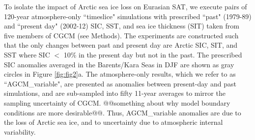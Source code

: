 \documentclass{nature}
\begin{document}


To isolate the impact of Arctic sea ice loss on Eurasian SAT, we execute pairs of 120-year atmosphere-only ``timeslice" simulations with prescribed ``past" (1979-89) and ``present day" (2002-12) SIC, SST, and sea ice thickness (SIT) taken from five members of CGCM (see Methods). The experiments are constructed such that the only changes between past and present day are Arctic SIC, SIT, and SST where SIC $<$ 10\% in the present day but not in the past. The prescribed SIC anomalies averaged in the Barents/Kara Seas in DJF are shown as gray circles in Figure \ref{fig:fig2}a. The atmosphere-only results, which we refer to as ``AGCM\_variable", are presented as anomalies between present-day and past simulations, and are sub-sampled into fifty 11-year averages to mirror the sampling uncertainty of CGCM. @@something about why model boundary conditions are more desirable@@. Thus, AGCM\_variable anomalies are due to the loss of Arctic sea ice, and to uncertainty due to atmospheric internal variability. %
\end{document}
